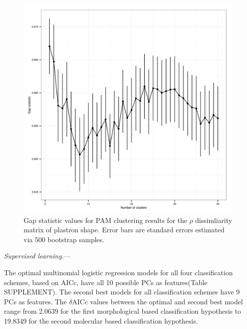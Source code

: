 \documentclass[12pt,letterpaper]{article}\usepackage{graphicx, color}
\renewcommand{\subsubsection}[1]{%
\vspace{2ex}
\noindent
\textit{#1.}---}
\begin{document}
\begin{figure}[ht]
  \centering
  \includegraphics[width = \textwidth]{figure/gap_res}
  \caption{Gap statistic values for PAM clustering results for the \(\rho\) dissimliarity matrix of plastron shape. Error bars are standard errors estimated via 500 bootstrap samples.}
  \label{fig:gap}
\end{figure}

\subsubsection{Supervised learning}


The optimal multinomial logistic regression models for all four classification schemes, based on AICc, have all 10 possible PCs as features(Table SUPPLEMENT). The second best models for all classification schemes have 9 PCs as features. The \(\delta\)AICc values between the optimal and second best model range from 2.0639 for the first morphological based classification hypothesis to 19.8349 for the second molecular based classification hypothesis. 
\end{document}
